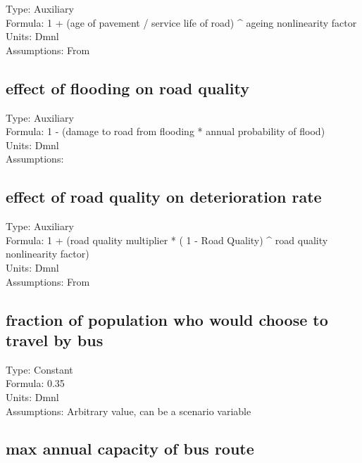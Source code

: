 \documentclass[
  11pt,
]{book}
\begin{document}
Type: Auxiliary\\
Formula: 1 + (age of pavement / service life of road) \^{} ageing nonlinearity factor\\
Units: Dmnl\\
Assumptions: From \citet{fallah-fini_measuring_2015}

\hypertarget{effect-of-flooding-on-road-quality}{%
\subsection{effect of flooding on road quality}\label{effect-of-flooding-on-road-quality}}

Type: Auxiliary\\
Formula: 1 - (damage to road from flooding * annual probability of flood)\\
Units: Dmnl\\
Assumptions:

\hypertarget{effect-of-road-quality-on-deterioration-rate}{%
\subsection{effect of road quality on deterioration rate}\label{effect-of-road-quality-on-deterioration-rate}}

Type: Auxiliary\\
Formula: 1 + (road quality multiplier * ( 1 - Road Quality) \^{} road quality nonlinearity factor)\\
Units: Dmnl\\
Assumptions: From \citet{fallah-fini_measuring_2015}

\hypertarget{fraction-of-population-who-would-choose-to-travel-by-bus}{%
\subsection{fraction of population who would choose to travel by bus}\label{fraction-of-population-who-would-choose-to-travel-by-bus}}

Type: Constant\\
Formula: 0.35\\
Units: Dmnl\\
Assumptions: Arbitrary value, can be a scenario variable

\hypertarget{max-annual-capacity-of-bus-route}{%
\subsection{max annual capacity of bus route}\label{max-annual-capacity-of-bus-route}}
\end{document}
